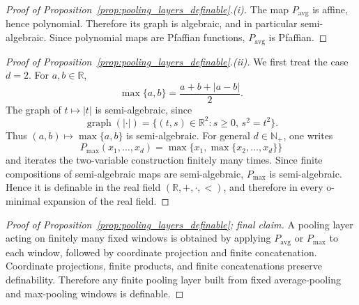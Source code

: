 \documentclass{article}
\theoremstyle{plain}
\theoremstyle{definition}
\theoremstyle{remark}
\theoremstyle{plain}
\numberwithin{thm}{section}
\theoremstyle{definition}
\numberwithin{equation}{section}
\begin{document}
\begin{proof}[{Proof of Proposition~\ref{prop:pooling_layers_definable}.(i)}]
The map $P_{\operatorname{avg}}$ is affine, hence polynomial.  Therefore its graph is algebraic, and in particular semi-algebraic.  Since polynomial maps are Pfaffian functions, $P_{\operatorname{avg}}$ is Pfaffian.
\end{proof}

\begin{proof}[{Proof of Proposition~\ref{prop:pooling_layers_definable}.(ii)}]
We first treat the case $d=2$.  For $a,b\in\mathbb{R}$,
$$
    \max\{a,b\}
    =
        \frac{a+b+|a-b|}{2}.
$$
The graph of $t\mapsto |t|$ is semi-algebraic, since
$$
    \operatorname{graph}(|\cdot|)
    =
    \big\{
        (t,s)\in\mathbb{R}^2:
        s\ge 0,\,
        s^2=t^2
    \big\}.
$$
Thus $(a,b)\mapsto \max\{a,b\}$ is semi-algebraic.  For general $d\in\mathbb{N}_+$, one writes
$$
    P_{\max}(x_1,\dots,x_d)
    =
        \max\big\{
            x_1,
            \max\{x_2,\dots,x_d\}
        \big\}
$$
and iterates the two-variable construction finitely many times.  Since finite compositions of semi-algebraic maps are semi-algebraic, $P_{\max}$ is semi-algebraic.  Hence it is definable in the real field $(\mathbb{R},+,\cdot,<)$, and therefore in every o-minimal expansion of the real field.
\end{proof}

\begin{proof}[{Proof of Proposition~\ref{prop:pooling_layers_definable}; final claim}]
A pooling layer acting on finitely many fixed windows is obtained by applying $P_{\operatorname{avg}}$ or $P_{\max}$ to each window, followed by coordinate projection and finite concatenation.  Coordinate projections, finite products, and finite concatenations preserve definability.  Therefore any finite pooling layer built from fixed average-pooling and max-pooling windows is definable.
\end{proof}
\end{document}
